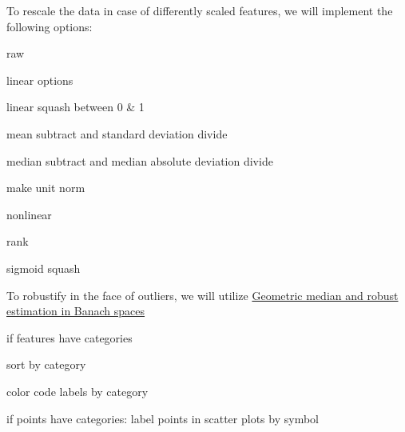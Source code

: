 \begin{compactitem}
\item To rescale the data in case of differently scaled features, we will implement the following options: 
\begin{compactitem}
  \item raw
  \item linear options
  \begin{compactitem}
    \item linear squash between 0 \& 1
    \item mean subtract and standard deviation divide
    \item median subtract and median absolute deviation divide
    \item make unit norm
  \end{compactitem}
  \item nonlinear
  \begin{compactitem}
    \item rank
    \item sigmoid squash
  \end{compactitem}
\end{compactitem}

\item To robustify in the face of outliers, we will utilize
 \href{http://projecteuclid.org/euclid.bj/1438777595}{Geometric median and robust estimation in Banach spaces} 

\item { if features have categories}
\begin{compactenum}
  \item sort by category
  \item color code labels by category
\end{compactenum}

\item { if points have categories}: 
   label points in scatter plots by symbol
\end{compactitem}


% 
